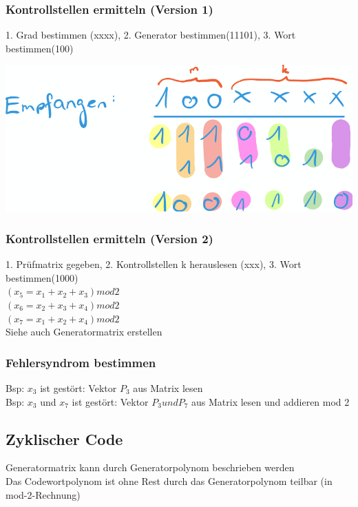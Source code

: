 \subsubsection{Kontrollstellen ermitteln (Version 1)}
1. Grad bestimmen (xxxx), 2. Generator bestimmen(11101), 3. Wort bestimmen(100)\\
\vspace{-8pt}
\begin{center}
    \includegraphics[scale=.3]{graphic/blockcode/kontrollstellen.png}
\end{center}
\vspace{-8pt}

\subsubsection{Kontrollstellen ermitteln (Version 2)}
1. Prüfmatrix gegeben, 2. Kontrollstellen k herauslesen (xxx), 3. Wort bestimmen(1000)\\
$(x_5 = x_1 + x_2 + x_3) mod 2$\\
$(x_6 = x_2 + x_3 + x_4) mod 2$\\
$(x_7 = x_1 + x_2 + x_4) mod 2$\\
Siehe auch Generatormatrix erstellen

\subsubsection{Fehlersyndrom bestimmen}
Bsp: $x_3$ ist gestört: Vektor $P_3$ aus Matrix lesen\\
Bsp: $x_3$ und $x_7$ ist gestört: Vektor $P_3 und P_7$ aus Matrix lesen und addieren mod 2\\




\subsection{Zyklischer Code}
Generatormatrix kann durch Generatorpolynom beschrieben werden\\
Das Codewortpolynom ist ohne Rest durch das Generatorpolynom teilbar (in mod-2-Rechnung)

